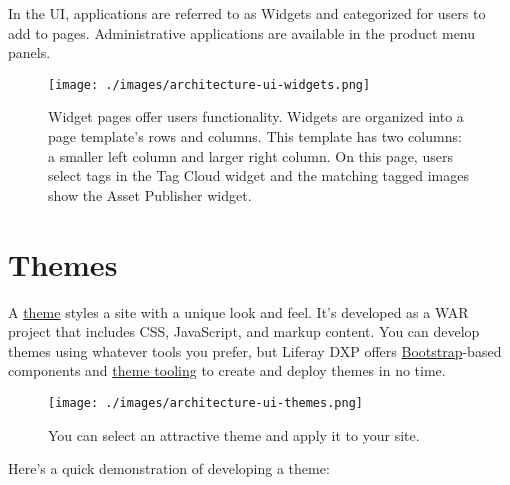 In the UI, applications are referred to as Widgets and categorized for
users to add to pages. Administrative applications are available in the
product menu panels.

\begin{figure}
\centering
\texttt{[image: ./images/architecture-ui-widgets.png]}
\caption{Widget pages offer users functionality. Widgets are organized
into a page template's rows and columns. This template has two columns:
a smaller left column and larger right column. On this page, users
select tags in the Tag Cloud widget and the matching tagged images show
the Asset Publisher widget.}
\end{figure}

\section{Themes}\label{themes}

A
\href{/docs/7-2/frameworks/-/knowledge_base/f/themes-introduction}{theme}
styles a site with a unique look and feel. It's developed as a WAR
project that includes CSS, JavaScript, and markup content. You can
develop themes using whatever tools you prefer, but Liferay DXP offers
\href{https://getbootstrap.com/}{Bootstrap}-based components and
\href{/docs/7-2/frameworks/-/knowledge_base/f/developing-themes}{theme
tooling} to create and deploy themes in no time.

\begin{figure}
\centering
\texttt{[image: ./images/architecture-ui-themes.png]}
\caption{You can select an attractive theme and apply it to your site.}
\end{figure}

Here's a quick demonstration of developing a theme:

